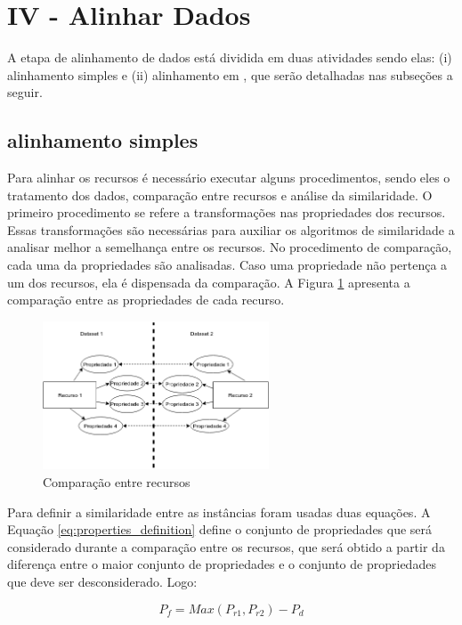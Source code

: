 \section{IV - Alinhar Dados}
A etapa de alinhamento de dados está dividida em duas atividades sendo elas: (i) alinhamento simples e (ii) alinhamento em , que serão detalhadas nas subseções a seguir.

\subsection{alinhamento simples}
\label{im_simples}
Para alinhar os recursos é necessário executar alguns procedimentos, sendo eles o tratamento dos dados, comparação entre recursos e análise da similaridade. O primeiro procedimento se refere a transformações nas propriedades dos recursos. Essas transformações são necessárias para auxiliar os algoritmos de similaridade a analisar melhor a semelhança entre os recursos. No procedimento de comparação, cada uma da propriedades são analisadas. Caso uma propriedade não pertença a um dos recursos, ela é dispensada da comparação. A Figura  \ref{fig:resources} apresenta a comparação entre as propriedades de cada recurso.

\begin{figure}[!h]
	\centering
	\includegraphics[width=0.6\textwidth]{./imagens/resources.png}
    \caption{Comparação entre recursos}
	\label{fig:resources}
\end{figure}

Para definir a similaridade entre as instâncias foram usadas duas equações. A Equação \ref{eq:properties_definition} define o conjunto de propriedades que será considerado durante a comparação entre os recursos, que será obtido a partir da diferença entre  o maior conjunto de propriedades e o conjunto de propriedades que deve ser desconsiderado. Logo:

\begin{equation}
P_f =M a x  ( P_{r1} ,P_{r2} ) - P_d
\label{eq:properties_definition}
\end{equation}

